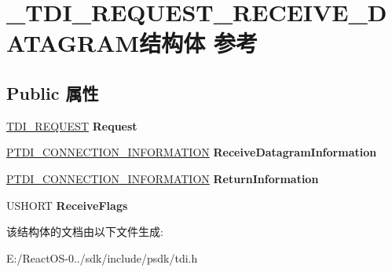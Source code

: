 \hypertarget{struct___t_d_i___r_e_q_u_e_s_t___r_e_c_e_i_v_e___d_a_t_a_g_r_a_m}{}\section{\+\_\+\+T\+D\+I\+\_\+\+R\+E\+Q\+U\+E\+S\+T\+\_\+\+R\+E\+C\+E\+I\+V\+E\+\_\+\+D\+A\+T\+A\+G\+R\+A\+M结构体 参考}
\label{struct___t_d_i___r_e_q_u_e_s_t___r_e_c_e_i_v_e___d_a_t_a_g_r_a_m}
\subsection*{Public 属性}
\begin{DoxyCompactItemize}
\item 
\mbox{\label{struct___t_d_i___r_e_q_u_e_s_t___r_e_c_e_i_v_e___d_a_t_a_g_r_a_m_ac5f51821093a4b89c5969eab40b64bc9}} 
\hyperlink{struct___t_d_i___r_e_q_u_e_s_t}{T\+D\+I\+\_\+\+R\+E\+Q\+U\+E\+ST} {\bfseries Request}
\item 
\mbox{\label{struct___t_d_i___r_e_q_u_e_s_t___r_e_c_e_i_v_e___d_a_t_a_g_r_a_m_ac02de67853993e06667f65e38f48a648}} 
\hyperlink{struct___t_d_i___c_o_n_n_e_c_t_i_o_n___i_n_f_o_r_m_a_t_i_o_n}{P\+T\+D\+I\+\_\+\+C\+O\+N\+N\+E\+C\+T\+I\+O\+N\+\_\+\+I\+N\+F\+O\+R\+M\+A\+T\+I\+ON} {\bfseries Receive\+Datagram\+Information}
\item 
\mbox{\label{struct___t_d_i___r_e_q_u_e_s_t___r_e_c_e_i_v_e___d_a_t_a_g_r_a_m_ae39f3023273fdfb27af1aa61d9236625}} 
\hyperlink{struct___t_d_i___c_o_n_n_e_c_t_i_o_n___i_n_f_o_r_m_a_t_i_o_n}{P\+T\+D\+I\+\_\+\+C\+O\+N\+N\+E\+C\+T\+I\+O\+N\+\_\+\+I\+N\+F\+O\+R\+M\+A\+T\+I\+ON} {\bfseries Return\+Information}
\item 
\mbox{\label{struct___t_d_i___r_e_q_u_e_s_t___r_e_c_e_i_v_e___d_a_t_a_g_r_a_m_ac65efffd9a48a7887cfc2d410e0eee4c}} 
U\+S\+H\+O\+RT {\bfseries Receive\+Flags}
\end{DoxyCompactItemize}


该结构体的文档由以下文件生成\+:\begin{DoxyCompactItemize}
\item 
E\+:/\+React\+O\+S-\/0../sdk/include/psdk/tdi.\+h\end{DoxyCompactItemize}
